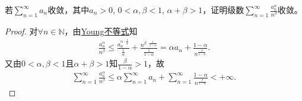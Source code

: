 \documentclass[../../main.tex]{subfiles}%
\begin{document}
\begin{example}
若$\sum\limits_{n=1}^{\infty}a_n$收敛，其中$a_n>0$, $0<\alpha,\beta<1$, $\alpha+\beta>1$，证明级数$\sum\limits_{n=1}^{\infty}\frac{a_n^{\alpha}}{n^{\beta}}$收敛。
\end{example}
\begin{proof}

对$\forall n\in\mathbb{N}$，由\hyperref[theorem:Young不等式]{Young不等式}知
\begin{align*}
\frac{a_n^{\alpha}}{n^{\beta}} \leqslant \frac{a_n^{\alpha \cdot \frac{1}{\alpha}}}{\frac{1}{\alpha}} + \frac{n^{\beta \cdot \frac{1}{1-\alpha}}}{\frac{1}{1-\alpha}} = \alpha a_n + \frac{1-\alpha}{n^{\frac{\beta}{1-\alpha}}}.
\end{align*}
又由$0<\alpha,\beta<1$且$\alpha+\beta>1$知$\frac{\beta}{1-\alpha}>1$，故
\begin{align*}
\sum\limits_{n=1}^{\infty}\frac{a_n^{\alpha}}{n^{\beta}} \leqslant \alpha \sum\limits_{n=1}^{\infty}a_n + \sum\limits_{n=1}^{\infty}\frac{1-\alpha}{n^{\frac{\beta}{1-\alpha}}} < +\infty.
\end{align*}
\end{proof}
\end{document}
